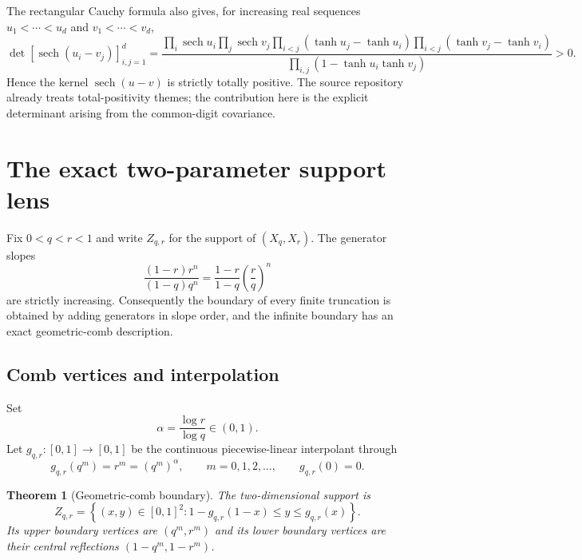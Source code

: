 \documentclass[11pt,a4paper]{article}
\newtheorem{theorem}{Theorem}[section]
\theoremstyle{definition}
\theoremstyle{remark}
\newcommand{\sech}{\operatorname{sech}}
\begin{document}
The rectangular Cauchy formula also gives, for increasing real sequences $u_1<\cdots<u_d$ and $v_1<\cdots<v_d$,
\begin{equation}
 \det[\sech(u_i-v_j)]_{i,j=1}^d
  =\frac{\displaystyle
   \prod_i\sech u_i\prod_j\sech v_j
   \prod_{i<j}(\tanh u_j-\tanh u_i)
   \prod_{i<j}(\tanh v_j-\tanh v_i)}
   {\displaystyle\prod_{i,j}(1-\tanh u_i\tanh v_j)}
  >0.
 \label{eq:sech-total-positive}
\end{equation}
Hence the kernel $\sech(u-v)$ is strictly totally positive.  The source repository already treats total-positivity themes; the contribution here is the explicit determinant arising from the common-digit covariance.

\section{The exact two-parameter support lens}
\label{sec:two-parameter}

Fix $0<q<r<1$ and write $Z_{q,r}$ for the support of $(X_q,X_r)$.  The generator slopes
\begin{equation}
  \frac{(1-r)r^n}{(1-q)q^n}
   =\frac{1-r}{1-q}\left(\frac rq\right)^n
\end{equation}
are strictly increasing.  Consequently the boundary of every finite truncation is obtained by adding generators in slope order, and the infinite boundary has an exact geometric-comb description.

\subsection{Comb vertices and interpolation}

Set
\begin{equation}
  \alpha=\frac{\log r}{\log q}\in(0,1).
  \label{eq:alpha}
\end{equation}
Let $g_{q,r}:[0,1]\to[0,1]$ be the continuous piecewise-linear interpolant through
\begin{equation}
  g_{q,r}(q^m)=r^m=(q^m)^\alpha,
  \qquad m=0,1,2,\ldots,
  \qquad g_{q,r}(0)=0.
  \label{eq:g-comb}
\end{equation}

\begin{theorem}[Geometric-comb boundary]
\label{thm:comb-boundary}
The two-dimensional support is
\begin{equation}
  Z_{q,r}
   =\left\{(x,y)\in[0,1]^2:
      1-g_{q,r}(1-x)\le y\le g_{q,r}(x)
     \right\}.
  \label{eq:lens-support}
\end{equation}
Its upper boundary vertices are $(q^m,r^m)$ and its lower boundary vertices are their central reflections $(1-q^m,1-r^m)$.
\end{theorem}
\end{document}
